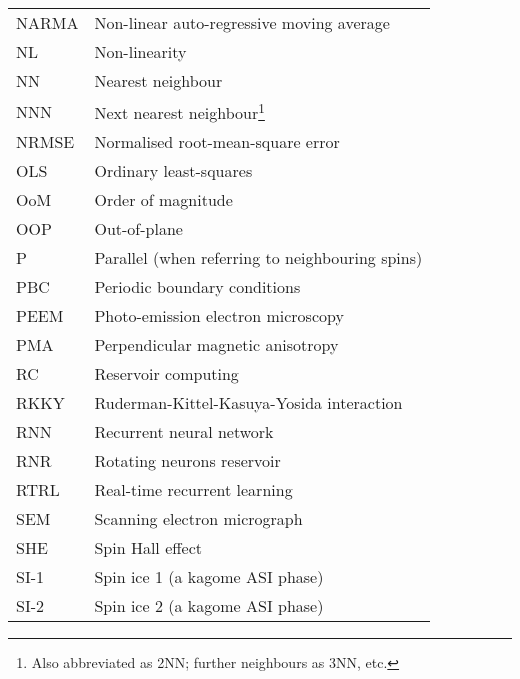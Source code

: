 {\begin{longtable}[l]{ll}
        NARMA & Non-linear auto-regressive moving average   \\
        NL    & Non-linearity                               \\
        NN    & Nearest neighbour                           \\
        NNN   & Next nearest neighbour\footnote{Also abbreviated as 2NN; further neighbours as 3NN, etc.} \\
        NRMSE & Normalised root-mean-square error           \\
        OLS   & Ordinary least-squares                      \\
        OoM   & Order of magnitude                          \\
        OOP   & Out-of-plane                                \\
        P     & Parallel (when referring to neighbouring spins) \\
        PBC   & Periodic boundary conditions                \\
        PEEM  & Photo-emission electron microscopy          \\
        PMA   & Perpendicular magnetic anisotropy           \\
        RC    & Reservoir computing                         \\
        RKKY  & Ruderman-Kittel-Kasuya-Yosida interaction   \\
        RNN   & Recurrent neural network                    \\
        RNR   & Rotating neurons reservoir                  \\
        RTRL  & Real-time recurrent learning                \\
        SEM   & Scanning electron micrograph                \\
        SHE   & Spin Hall effect                            \\
        SI-1  & Spin ice 1 (a kagome ASI phase)             \\
        SI-2  & Spin ice 2 (a kagome ASI phase)             \\

\end{longtable}}
